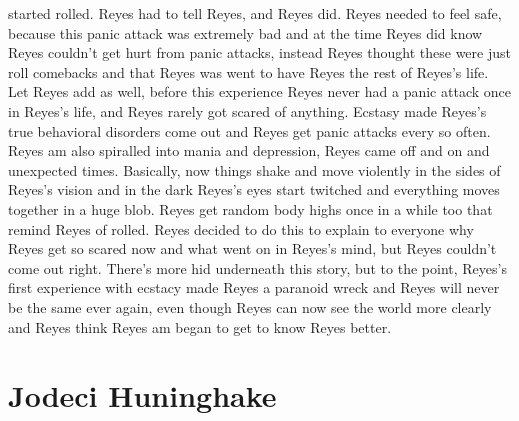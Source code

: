 \documentclass[12pt]{book}
\begin{document}
started rolled. Reyes had to tell Reyes, and Reyes did. Reyes needed to feel safe, because this panic attack was extremely bad and at the time Reyes did know Reyes couldn't get hurt from panic attacks, instead Reyes thought these were just roll comebacks and that Reyes was went to have Reyes the rest of Reyes's life. Let Reyes add as well, before this experience Reyes never had a panic attack once in Reyes's life, and Reyes rarely got scared of anything. Ecstasy made Reyes's true behavioral disorders come out and Reyes get panic attacks every so often. Reyes am also spiralled into mania and depression, Reyes came off and on and unexpected times. Basically, now things shake and move violently in the sides of Reyes's vision and in the dark Reyes's eyes start twitched and everything moves together in a huge blob. Reyes get random body highs once in a while too that remind Reyes of rolled. Reyes decided to do this to explain to everyone why Reyes get so scared now and what went on in Reyes's mind, but Reyes couldn't come out right. There's more hid underneath this story, but to the point, Reyes's first experience with ecstacy made Reyes a paranoid wreck and Reyes will never be the same ever again, even though Reyes can now see the world more clearly and Reyes think Reyes am began to get to know Reyes better.



\chapter{Jodeci Huninghake}
\end{document}
